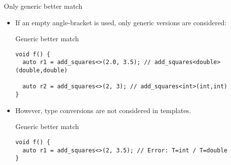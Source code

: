 \begin{frame}[t,fragile]{Only generic better match}
\begin{itemize}
  \item If an empty angle-bracket is used, only generic versions are considered:

\begin{block}{Generic better match}
\begin{lstlisting}
void f() {
  auto r1 = add_squares<>(2.0, 3.5); // add_squares<double>(double,double)

  auto r2 = add_squares<>(2, 3); // add_squares<int>(int,int)
}
\end{lstlisting}
\end{block}

  \item However, type conversions are not considered in templates.

\begin{block}{Generic better match}
\begin{lstlisting}
void f() {
  auto r1 = add_squares<>(2, 3.5); // Error: T=int / T=double
}
\end{lstlisting}
\end{block}

\end{itemize}
\end{frame}
